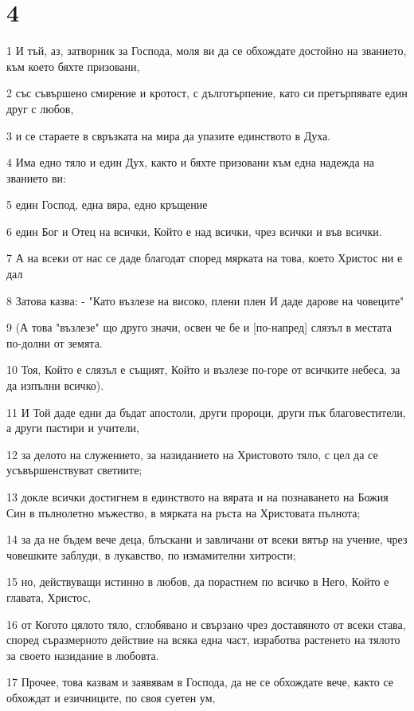 \chapter{4}

\par 1 И тъй, аз, затворник за Господа, моля ви да се обхождате достойно на званието, към което бяхте призовани,
\par 2 със съвършено смирение и кротост, с дълготърпение, като си претърпявате един друг с любов,
\par 3 и се стараете в свръзката на мира да упазите единството в Духа.
\par 4 Има едно тяло и един Дух, както и бяхте призовани към една надежда на званието ви:
\par 5 един Господ, една вяра, едно кръщение
\par 6 един Бог и Отец на всички, Който е над всички, чрез всички и във всички.
\par 7 А на всеки от нас се даде благодат според мярката на това, което Христос ни е дал
\par 8 Затова казва: - "Като възлезе на високо, плени плен И даде дарове на човеците"
\par 9 (А това "възлезе" що друго значи, освен че бе и [по-напред] слязъл в местата по-долни от земята.
\par 10 Тоя, Който е слязъл е същият, Който и възлезе по-горе от всичките небеса, за да изпълни всичко).
\par 11 И Той даде едни да бъдат апостоли, други пророци, други пък благовестители, а други пастири и учители,
\par 12 за делото на служението, за назиданието на Христовото тяло, с цел да се усъвършенствуват светиите;
\par 13 докле всички достигнем в единството на вярата и на познаването на Божия Син в пълнолетно мъжество, в мярката на ръста на Христовата пълнота;
\par 14 за да не бъдем вече деца, блъскани и завличани от всеки вятър на учение, чрез човешките заблуди, в лукавство, по измамителни хитрости;
\par 15 но, действуващи истинно в любов, да порастнем по всичко в Него, Който е главата, Христос,
\par 16 от Когото цялото тяло, сглобявано и свързано чрез доставяното от всеки става, според съразмерното действие на всяка една част, изработва растенето на тялото за своето назидание в любовта.
\par 17 Прочее, това казвам и заявявам в Господа, да не се обхождате вече, както се обхождат и езичниците, по своя суетен ум,
